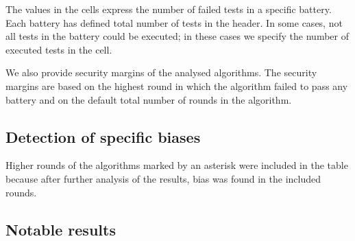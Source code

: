 \documentclass[
  digital,  	%
  color,		%
  oneside,   	%
  12pt,
  nocover,
  notable,
  nolof,
  nolot,
]{fithesis3}
\theoremstyle{definition}
\theoremstyle{remark}
\begin{document}
The values in the cells express the number of failed tests in a specific battery. Each battery has defined total number of tests in the header. In some cases, not all tests in the battery could be executed; in these cases we specify the number of executed tests in the cell.

We also provide security margins of the analysed algorithms. The security margins are based on the highest round in which the algorithm failed to pass any battery and on the default total number of rounds in the algorithm.

\subsection{Detection of specific biases}

Higher rounds of the algorithms marked by an asterisk were included in the table because after further analysis of the results, bias was found in the included rounds.

\subsection{Notable results}
\label{sec:notable_results}
\end{document}
